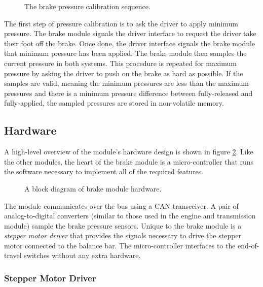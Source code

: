 \begin{figure}[H]
	\centering
	
	\caption{The brake pressure calibration sequence.}
	\label{fig:brake_pressure_calibration_flow}
\end{figure}

The first step of pressure calibration is to ask the driver to apply minimum pressure. The brake module signals the driver interface to request the driver take their foot off the brake. Once done, the driver interface signals the brake module that minimum pressure has been applied. The brake module then samples the current pressure in both systems. This procedure is repeated for maximum pressure by asking the driver to push on the brake as hard as possible. If the samples are valid, meaning the minimum pressures are less than the maximum pressures and there is a minimum pressure difference between fully-released and fully-applied, the sampled pressures are stored in non-volatile memory.

\subsection{Hardware}

A high-level overview of the module's hardware design is shown in figure \ref{fig:brake_hardware_design_block}. Like the other modules, the heart of the brake module is a micro-controller that runs the software necessary to implement all of the required features. 

\begin{figure}[H]
\centering

\caption{A block diagram of brake module hardware.}
\label{fig:brake_hardware_design_block}
\end{figure}

The module communicates over the bus using a CAN transceiver. A pair of analog-to-digital converters (similar to those used in the engine and transmission module) sample the brake pressure sensors. Unique to the brake module is a \emph{stepper motor driver} that provides the signals necessary to drive the stepper motor connected to the balance bar. The micro-controller interfaces to the end-of-travel switches without any extra hardware.

\subsubsection{Stepper Motor Driver}

